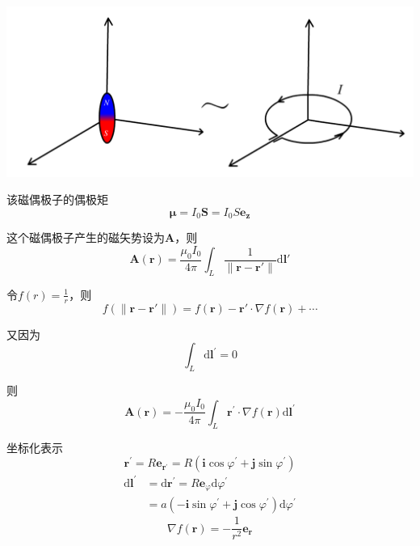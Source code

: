 \documentclass{CLGPY}
\begin{document}
\begin{multicols}{1}
        \begin{center}
            \includegraphics[scale=.2]{./fig/20210615122211.png}
        \end{center}

该磁偶极子的偶极矩
\begin{equation}
\bm{\mu}=I_0\bm{S}=I_0S\bm{e_z}
\end{equation}

这个磁偶极子产生的磁矢势设为$\bm{A}$，则
\begin{equation}
\bm{A}(\bm{r})=\frac{\mu_0I_0}{4\pi}\int_L\frac{1}{\|\bm{r-r'}\|}\text{d}\bm{l'}
\end{equation}

令$\displaystyle f(r)=\frac{1}{r}$，则
\begin{equation}
f(\|\bm{r-r'}\|)=f(\bm{r})-\bm{r'}·\nabla f(\bm{r})+\cdots
\end{equation}

又因为
\begin{equation}
\int_{L} \text{d} \boldsymbol{l}^{\prime}=0
\end{equation}

则
\begin{equation}
\boldsymbol{A}(\boldsymbol{r})=-\frac{\mu_{0} I_{0}}{4 \pi} \int_{L} \boldsymbol{r}^{\prime} \cdot \nabla f(\boldsymbol{r}) \text{d} \boldsymbol{l}^{\prime}
\end{equation}

坐标化表示
\begin{equation}
\boldsymbol{r}^{\prime}=R \boldsymbol{e}_{\boldsymbol{r}^{\prime}}=R\left(\boldsymbol{i} \cos \varphi^{\prime}+\boldsymbol{j} \sin \varphi^{\prime}\right)
\end{equation}
\begin{equation}
\begin{aligned}
\text{d} \boldsymbol{l}^{\prime}&=\text{d} \boldsymbol{r}^{\prime}=R \boldsymbol{e}_{\varphi} \text{d} \varphi^{\prime}\\&=a\left(-\boldsymbol{i} \sin \varphi^{\prime}+\boldsymbol{j} \cos \varphi^{\prime}\right) \text{d} \varphi^{\prime}
\end{aligned}
\end{equation}
\begin{equation}
\nabla f(\bm{r})=-\frac{1}{r^{2}} \boldsymbol{e}_{\boldsymbol{r}}
\end{equation}


\end{multicols}
\end{document}
